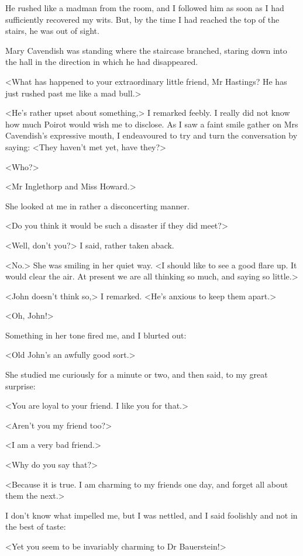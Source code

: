  He rushed like a madman from the room, and I followed him as soon as I had sufficiently recovered my wits. But, by the time I had reached the top of the stairs, he was out of sight. 

 Mary Cavendish was standing where the staircase branched, staring down into the hall in the direction in which he had disappeared. 

 <What has happened to your extraordinary little friend, Mr Hastings? He has just rushed past me like a mad bull.> 

 <He's rather upset about something,> I remarked feebly. I really did not know how much Poirot would wish me to disclose. As I saw a faint smile gather on Mrs Cavendish's expressive mouth, I endeavoured to try and turn the conversation by saying: <They haven't met yet, have they?> 

 <Who?> 

 <Mr Inglethorp and Miss Howard.> 

 She looked at me in rather a disconcerting manner. 

 <Do you think it would be such a disaster if they did meet?> 

 <Well, don't you?> I said, rather taken aback. 

 <No.> She was smiling in her quiet way. <I should like to see a good flare up. It would clear the air. At present we are all thinking so much, and saying so little.> 

 <John doesn't think so,> I remarked. <He's anxious to keep them apart.> 

 <Oh, John!> 

 Something in her tone fired me, and I blurted out: 

 <Old John's an awfully good sort.> 

 She studied me curiously for a minute or two, and then said, to my great surprise: 

 <You are loyal to your friend. I like you for that.> 

 <Aren't you my friend too?> 

 <I am a very bad friend.> 

 <Why do you say that?> 

 <Because it is true. I am charming to my friends one day, and forget all about them the next.> 

 I don't know what impelled me, but I was nettled, and I said foolishly and not in the best of taste: 

 <Yet you seem to be invariably charming to Dr Bauerstein!> 

